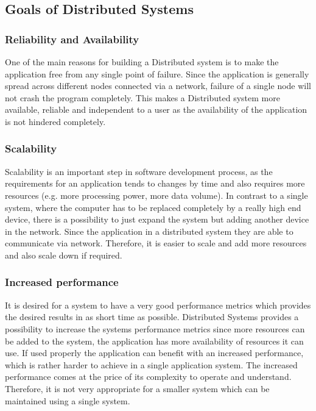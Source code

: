     \subsection{Goals of Distributed Systems} 
        \subsubsection{Reliability and Availability}
        One of the main reasons for building a Distributed system is to make the application free from any single point of failure.
        Since the application is generally spread across different nodes connected via a network, failure of a single node will not 
        crash the program completely. This makes a Distributed system more available, reliable and independent to a user as the availability
        of the application is not hindered completely.
        
        \subsubsection{Scalability}
        Scalability is an important step in software development process, as the requirements for an application tends to changes by time and also requires more resources
        (e.g. more processing power, more data volume). 
        In contrast to a single system, where the computer 
        has to be replaced completely by a really high end device, there is a possibility to just expand the system but adding another device in the network.
        Since the application in a distributed system they are able to communicate via network. Therefore, it is easier to scale and add more resources and 
        also scale down if required. 

        \subsubsection{Increased performance}
        It is desired for a system to have a very good performance metrics which provides the desired results in as short time as possible.
        Distributed Systems provides a possibility to increase the systems performance metrics since more resources can be added to the system,
        the application has more availability of resources it can use. If used properly the application can benefit with an increased performance, 
        which is rather harder to achieve in a single application system. The increased performance comes at the price of its complexity to operate and understand.
        Therefore, it is not very appropriate for a smaller system which can be maintained using a single system.
    
